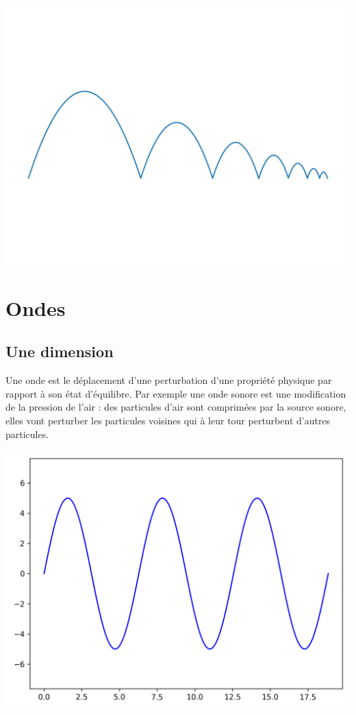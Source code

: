 \documentclass[11pt,class=report,crop=false]{standalone}
\begin{document}
\begin{center}
	\includegraphics[scale=\myscale,scale=0.5,trim={0 3cm 0 3cm},clip]{figures/balle-rebond}
\end{center}



\section{Ondes}


\subsection{Une dimension}

Une onde est le déplacement d'une perturbation d'une propriété physique par rapport à son état d'équilibre.
Par exemple une onde sonore est une modification de la pression de l'air : des particules d'air sont comprimées par la source sonore, elles vont perturber les particules voisines qui à leur tour perturbent d'autres particules.

\begin{center}
	\includegraphics[scale=\myscale,scale=0.5]{figures/ondes1D-1}
\end{center}
\end{document}
